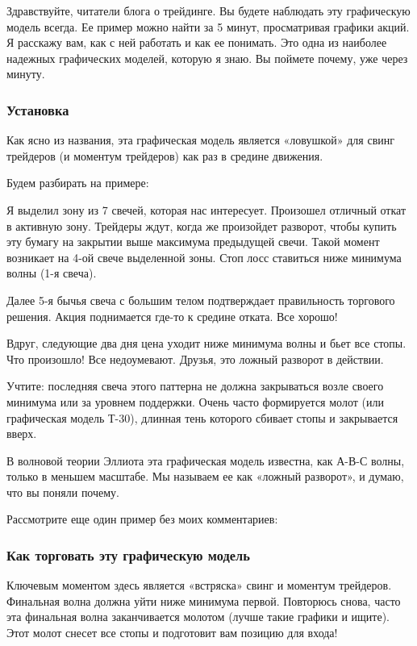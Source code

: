 \documentclass{book}
\begin{document}
Здравствуйте, читатели блога о трейдинге. Вы будете наблюдать эту
графическую модель всегда. Ее пример можно найти за 5 минут,
просматривая графики акций. Я расскажу вам, как с ней работать и как
ее понимать. Это одна из наиболее надежных графических моделей,
которую я знаю. Вы поймете почему, уже через минуту.

\subsubsection{Установка}

Как ясно из названия, эта графическая модель является «ловушкой» для свинг трейдеров (и моментум трейдеров) как раз в средине движения.

Будем разбирать на примере:

Я выделил зону из 7 свечей, которая нас интересует. Произошел отличный откат в активную зону. Трейдеры ждут, когда же произойдет разворот, чтобы купить эту бумагу на закрытии выше максимума предыдущей свечи. Такой момент возникает на 4-ой свече выделенной зоны. Стоп лосс ставиться ниже минимума волны (1-я свеча).

Далее 5-я бычья свеча с большим телом подтверждает правильность торгового решения. Акция поднимается где-то к средине отката. Все хорошо!

Вдруг, следующие два дня цена уходит ниже минимума волны и бьет все стопы. Что произошло! Все недоумевают. Друзья, это ложный разворот в действии.

Учтите: последняя свеча этого паттерна не должна закрываться возле своего минимума или за уровнем поддержки. Очень часто формируется молот (или графическая модель Т-30), длинная тень которого сбивает стопы и закрывается вверх.

В волновой теории Эллиота эта графическая модель известна, как А-В-С волны, только в меньшем масштабе. Мы называем ее как «ложный разворот», и думаю, что вы поняли почему.

Рассмотрите еще один пример без моих комментариев:

\subsubsection{Как торговать эту графическую модель}

Ключевым моментом здесь является «встряска» свинг и моментум
трейдеров. Финальная волна должна уйти ниже минимума первой. Повторюсь
снова, часто эта финальная волна заканчивается молотом (лучше такие
графики и ищите). Этот молот снесет все стопы и подготовит вам позицию
для входа!
\end{document}
